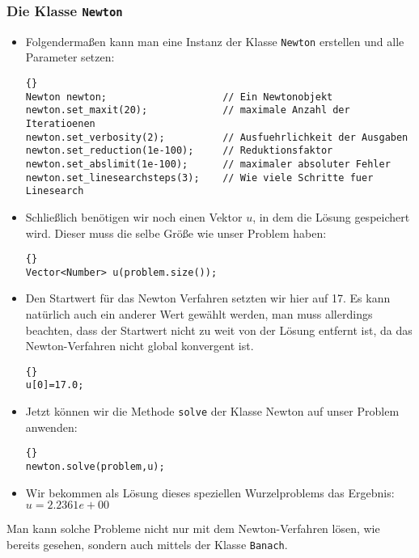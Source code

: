 \documentclass[a4paper,11pt]{article}
\theoremstyle{definition}
\begin{document}
\subsubsection{Die Klasse \lstinline{Newton}}
\begin{itemize}
\item Folgendermaßen kann man eine Instanz der Klasse \lstinline{Newton} erstellen und alle Parameter setzen:
    {\footnotesize{\begin{lstlisting}{}
Newton newton;                    // Ein Newtonobjekt
newton.set_maxit(20);             // maximale Anzahl der Iteratioenen
newton.set_verbosity(2);          // Ausfuehrlichkeit der Ausgaben
newton.set_reduction(1e-100);     // Reduktionsfaktor
newton.set_abslimit(1e-100);      // maximaler absoluter Fehler
newton.set_linesearchsteps(3);    // Wie viele Schritte fuer Linesearch
        \end{lstlisting}}}
    \item Schließlich benötigen wir noch einen Vektor $u$, in dem die Lösung gespeichert wird. Dieser muss die selbe Größe wie unser Problem haben:
    {\footnotesize{\begin{lstlisting}{}
Vector<Number> u(problem.size());
          \end{lstlisting}}}
    \item Den Startwert für das Newton Verfahren setzten wir hier auf 17. Es kann natürlich auch ein anderer Wert gewählt werden, man muss allerdings beachten, dass der Startwert nicht zu weit von der Lösung entfernt ist, da das Newton-Verfahren nicht global konvergent ist.
      {\footnotesize{\begin{lstlisting}{}
u[0]=17.0;
          \end{lstlisting}}}
    \item Jetzt können wir die Methode \lstinline{solve} der Klasse Newton auf unser Problem anwenden:
      {\footnotesize{\begin{lstlisting}{}
newton.solve(problem,u);
          \end{lstlisting}}}
    \item Wir bekommen als Lösung dieses speziellen Wurzelproblems das Ergebnis:\\
     $u= 2.2361e+00$
\end{itemize}

Man kann solche Probleme nicht nur mit dem Newton-Verfahren lösen, wie bereits gesehen, sondern auch mittels der Klasse \lstinline{Banach}.
\end{document}

